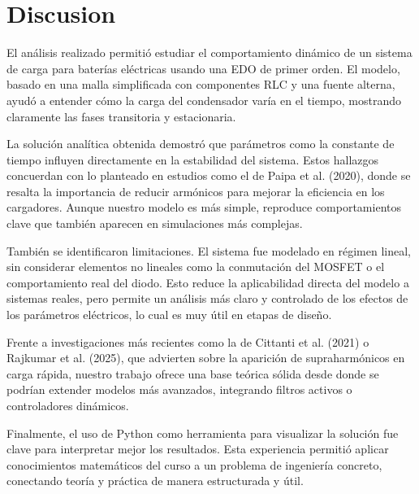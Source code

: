 \section{Discusion}

El análisis realizado permitió estudiar el comportamiento dinámico de un sistema de carga para baterías eléctricas usando una EDO de primer orden. El modelo, basado en una malla simplificada con componentes RLC y una fuente alterna, ayudó a entender cómo la carga del condensador varía en el tiempo, mostrando claramente las fases transitoria y estacionaria.

La solución analítica obtenida demostró que parámetros como la constante de tiempo influyen directamente en la estabilidad del sistema. Estos hallazgos concuerdan con lo planteado en estudios como el de Paipa et al. (2020), donde se resalta la importancia de reducir armónicos para mejorar la eficiencia en los cargadores. Aunque nuestro modelo es más simple, reproduce comportamientos clave que también aparecen en simulaciones más complejas.

También se identificaron limitaciones. El sistema fue modelado en régimen lineal, sin considerar elementos no lineales como la conmutación del MOSFET o el comportamiento real del diodo. Esto reduce la aplicabilidad directa del modelo a sistemas reales, pero permite un análisis más claro y controlado de los efectos de los parámetros eléctricos, lo cual es muy útil en etapas de diseño.

Frente a investigaciones más recientes como la de Cittanti et al. (2021) o Rajkumar et al. (2025), que advierten sobre la aparición de supraharmónicos en carga rápida, nuestro trabajo ofrece una base teórica sólida desde donde se podrían extender modelos más avanzados, integrando filtros activos o controladores dinámicos.

Finalmente, el uso de Python como herramienta para visualizar la solución fue clave para interpretar mejor los resultados. Esta experiencia permitió aplicar conocimientos matemáticos del curso a un problema de ingeniería concreto, conectando teoría y práctica de manera estructurada y útil.
